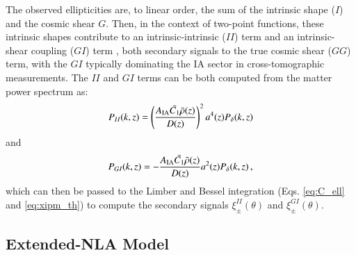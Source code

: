 
The observed ellipticities are, to linear order, the sum of the intrinsic shape ($I$) and the cosmic shear $G$. Then, in the context of two-point functions, these intrinsic shapes contribute to an intrinsic-intrinsic ($II$) term and an intrinsic-shear coupling ($GI$) term \citep{Hirata2004}, both secondary signals to the true cosmic shear ($GG$) term, with the $GI$ typically dominating the IA sector in cross-tomographic measurements. 
The $II$ and $GI$ terms  can be both computed from the matter power spectrum as: 
 \begin{eqnarray}
P_{II}(k,z) =  \left(\frac{A_{\rm IA}\bar{C_1}\bar{\rho}(z)}{D(z)}\right)^2a^4(z) P_{\delta}(k,z)
\label{eq:Pk_II_th}
\end{eqnarray}
and
\begin{eqnarray}
P_{GI}(k,z) = - \frac{A_{\rm IA}\bar{C_1}\bar{\rho}(z)}{D(z)}a^2(z) P_{\delta}(k,z) \, ,
\label{eq:Pk_GI_th}
\end{eqnarray}
which can then be passed to the Limber and Bessel integration (Eqs. \ref{eq:C_ell} and \ref{eq:xipm_th}) to compute  the secondary signals $\xi_{\pm}^{II}(\theta)$ and $\xi_{\pm}^{GI}(\theta)$. 


\subsection{Extended-NLA Model}
\label{subsec:IA_th_extNLA}




